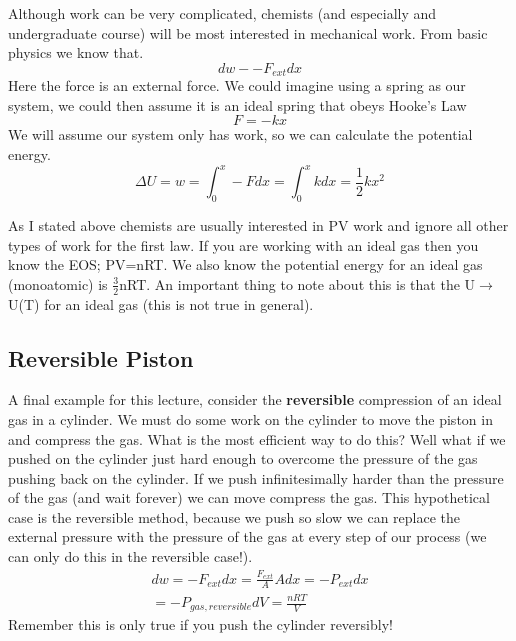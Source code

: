 \documentclass{article}
\begin{document}
Although work can be very complicated, chemists (and especially and undergraduate course) will be most interested in mechanical work. 
From basic physics we know that. 
\begin{equation}
dw - -F_{ext}dx
\end{equation}
Here the force is an external force. 
We could imagine using a spring as our system, we could then assume it is an ideal spring that obeys Hooke's Law
\begin{equation}
F=-kx
\end{equation}
We will assume our system only has work, so we can calculate the potential energy. 
\begin{equation}
\Delta U = w = \int_0^x -Fdx = \int_0^x kdx = \frac{1}{2}kx^2
\end{equation}

As I stated above chemists are usually interested in PV work and ignore all other types of work for the first law. 
If you are working with an ideal gas then you know the EOS; PV=nRT. 
We also know the potential energy for an ideal gas (monoatomic) is $\frac{3}{2}$nRT. 
An important thing to note about this is that the U$\rightarrow$U(T) for an ideal gas (this is not true in general). 

\subsection*{Reversible Piston}
A final example for this lecture, consider the \textbf{reversible} compression of an ideal gas in a cylinder. 
We must do some work on the cylinder to move the piston in and compress the gas. 
What is the most efficient way to do this? 
Well what if we pushed on the cylinder just hard enough to overcome the pressure of the gas pushing back on the cylinder.
If we push infinitesimally harder than the pressure of the gas (and wait forever) we can move compress the gas. 
This hypothetical case is the reversible method, because we push so slow we can replace the external pressure with the pressure of the gas at every step of our process (we can only do this in the reversible case!). 
\begin{equation}
\begin{split}
   dw = -F_{ext}dx = \frac{F_{ext}}{A}Adx = -P_{ext}dx \\
   = -P_{gas,reversible}dV = \frac{nRT}{V}
\end{split}
\end{equation}
Remember this is only true if you push the cylinder reversibly!
 
\end{document}
